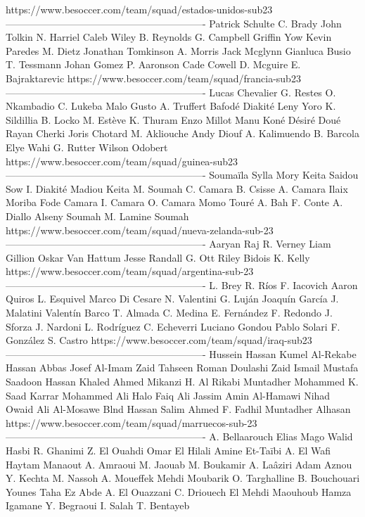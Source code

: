 https://www.besoccer.com/team/squad/estados-unidos-sub23 
------------------------------------------------------------- 
Patrick Schulte
C. Brady
John Tolkin
N. Harriel
Caleb Wiley
B. Reynolds
G. Campbell
Griffin Yow
Kevin Paredes
M. Dietz
Jonathan Tomkinson
A. Morris
Jack Mcglynn
Gianluca Busio
T. Tessmann
Johan Gomez
P. Aaronson
Cade Cowell
D. Mcguire
E. Bajraktarevic
https://www.besoccer.com/team/squad/francia-sub23 
------------------------------------------------------------- 
Lucas Chevalier
G. Restes
O. Nkambadio
C. Lukeba
Malo Gusto
A. Truffert
Bafodé Diakité
Leny Yoro
K. Sildillia
B. Locko
M. Estève
K. Thuram
Enzo Millot
Manu Koné
Désiré Doué
Rayan Cherki
Joris Chotard
M. Akliouche
Andy Diouf
A. Kalimuendo
B. Barcola
Elye Wahi
G. Rutter
Wilson Odobert
https://www.besoccer.com/team/squad/guinea-sub23 
------------------------------------------------------------- 
Soumaïla Sylla
Mory Keita
Saidou Sow
I. Diakité
Madiou Keita
M. Soumah
C. Camara
B. Csisse
A. Camara
Ilaix Moriba
Fode Camara
I. Camara
O. Camara
Momo Touré
A. Bah
F. Conte
A. Diallo
Alseny Soumah
M. Lamine Soumah
https://www.besoccer.com/team/squad/nueva-zelanda-sub-23 
------------------------------------------------------------- 
Aaryan Raj
R. Verney
Liam Gillion
Oskar Van Hattum
Jesse Randall
G. Ott
Riley Bidois
K. Kelly
https://www.besoccer.com/team/squad/argentina-sub-23 
------------------------------------------------------------- 
L. Brey
R. Ríos
F. Iacovich
Aaron Quiros
L. Esquivel
Marco Di Cesare
N. Valentini
G. Luján
Joaquín García
J. Malatini
Valentín Barco
T. Almada
C. Medina
E. Fernández
F. Redondo
J. Sforza
J. Nardoni
L. Rodríguez
C. Echeverri
Luciano Gondou
Pablo Solari
F. González
S. Castro
https://www.besoccer.com/team/squad/iraq-sub23 
------------------------------------------------------------- 
Hussein Hassan
Kumel Al-Rekabe
Hassan Abbas
Josef Al-Imam
Zaid Tahseen
Roman Doulashi
Zaid Ismail
Mustafa Saadoon
Hassan Khaled
Ahmed Mikanzi
H. Al Rikabi
Muntadher Mohammed
K. Saad
Karrar Mohammed Ali
Halo Faiq
Ali Jassim
Amin Al-Hamawi
Nihad Owaid
Ali Al-Mosawe
Blnd Hassan
Salim Ahmed
F. Fadhil
Muntadher Alhasan
https://www.besoccer.com/team/squad/marruecos-sub-23 
------------------------------------------------------------- 
A. Bellaarouch
Elias Mago
Walid Hasbi
R. Ghanimi
Z. El Ouahdi
Omar El Hilali
Amine Et-Taïbi
A. El Wafi
Haytam Manaout
A. Amraoui
M. Jaouab
M. Boukamir
A. Laâziri
Adam Aznou
Y. Kechta
M. Nassoh
A. Moueffek
Mehdi Moubarik
O. Targhalline
B. Bouchouari
Younes Taha
Ez Abde
A. El Ouazzani
C. Driouech
El Mehdi Maouhoub
Hamza Igamane
Y. Begraoui
I. Salah
T. Bentayeb
